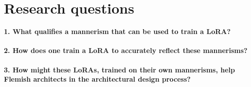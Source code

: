 \section{Research questions}\label{sec:research questions}

\textbf{1. What qualifies a mannerism that can be used to train a LoRA?\\~\\2. How does one train a LoRA to accurately reflect these mannerisms?\\~\\3. How might these LoRAs, trained on their own mannerisms, help Flemish architects in the architectural design process?}